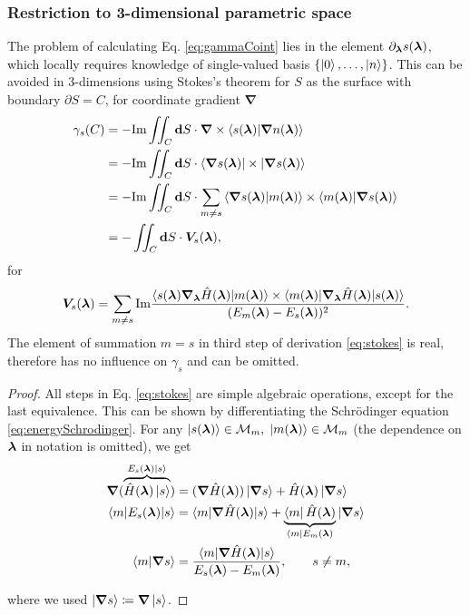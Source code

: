 \subsubsection{Restriction to 3-dimensional parametric space}
The problem of calculating Eq. \ref{eq:gammaCoint} lies in the element $\partial_{\bm\lambda} s({\bm\lambda})$, which locally requires knowledge of single-valued basis $\{\ket{0},\dots, \ket{n}\}$. This can be avoided in 3-dimensions using Stokes's theorem for $S$ as the surface with boundary $\partial S=C$, for coordinate gradient $\bm \nabla$
\begin{equation}
    \begin{split}
        \gamma_s(C) &= -\textrm{Im} \iint_C \bm{\mathrm{d}} S \cdot \bm \nabla \times \braket{s({\bm\lambda})|\bm \nabla n({\bm\lambda})}\\
         &= -\textrm{Im} \iint_C \bm{\mathrm{d}} S \cdot \braket{\bm \nabla s({\bm\lambda})|\times|\bm \nabla s({\bm\lambda})}\\
        &= -\textrm{Im} \iint_C \bm{\mathrm{d}} S \cdot \sum_{m\neq s} \braket{\bm \nabla s({\bm\lambda})|m({\bm\lambda})}\times \braket{m({\bm\lambda})|\bm \nabla s({\bm\lambda})}\\
        &= -\iint_C \bm{\mathrm{d}} S \cdot \bm V_s({\bm\lambda}),
    \end{split}
    \label{eq:stokes}
\end{equation}
for 
\begin{equation}
    \bm V_s({\bm\lambda}) = \sum_{m\neq s} \textrm{Im} \frac{
            \braket{s({\bm\lambda})\bm \nabla_{\bm\lambda} \hat{H}({\bm\lambda}) |m({\bm\lambda})}\times \braket{m({\bm\lambda})|\bm \nabla_{\bm\lambda} \hat{H}({\bm\lambda})|s({\bm\lambda})}    
             }{
(E_m({\bm\lambda})-E_s({\bm\lambda}))^2
             }.
\end{equation}
The element of summation $m=s$ in third step of derivation \ref{eq:stokes} is real, therefore has no influence on $\gamma_s$ and can be omitted. 

\begin{proof}
 All steps in Eq. \ref{eq:stokes} are simple algebraic operations, except for the last equivalence. This can be shown by differentiating the Schr\"odinger equation \ref{eq:energySchrodinger}. For any $\ket{s({\bm\lambda})}\in \mathcal{M}_m,\;\ket{m({\bm\lambda})}\in \mathcal{M}_m$ (the dependence on ${\bm\lambda}$ in notation is omitted), we get
\begin{equation}
    \begin{split}
        \bm \nabla (\overbrace{\hat{H}({\bm\lambda})\ket{s}}^{E_s({\bm\lambda})\ket{s}})&= (\bm\nabla \hat{H}({\bm\lambda}))\ket{\bm \nabla s} +\hat{H}({\bm\lambda}) \ket{\bm \nabla s}\\
        \braket{m|E_s({\bm\lambda})|s}&= \braket{m|\bm \nabla \hat{H}({\bm\lambda})| s}+ \underbrace{\bra{m} \hat{H}({\bm\lambda})}_{\bra{m} E_m({\bm\lambda})} |\bm\nabla s\rangle \\
        \braket{m|\bm \nabla s}&=
        \frac{\braket{m|\bm \nabla \hat{H}({\bm\lambda}) |s}}
        { E_s({\bm\lambda})-E_m({\bm\lambda})}, \qquad s\neq m,
    \end{split}
    \label{eq:mgradn_proof}
\end{equation}

where we used $\ket{\bm \nabla s}\coloneqq\bm \nabla \ket{ s}$.    
\end{proof} 

